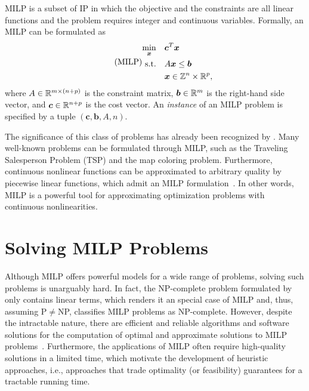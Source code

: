 MILP is a subset of IP in which the objective and the constraints are all linear functions and the problem requires integer and continuous variables.
Formally, an MILP can be formulated as 
\begin{equation}\label{eq:general-milp}\tag{MILP}
\begin{split}
    \min_{\bm{x}} \quad & \bm{c}^{T}\bm{x} \\
    \textrm{s.t.} \quad & A\bm{x} \le \bm{b} \\
	  & \bm{x} \in \mathbb{Z}^{n}\times \mathbb{R}^{p}
,\end{split}
\end{equation}
where $A\in \mathbb{R}^{m\times (n+p)}$ is the constraint matrix, $\bm{b}\in \mathbb{R}^{m}$ is the right-hand side vector, and $\bm{c}\in \mathbb{R}^{n+p}$ is the cost vector.
An \emph{instance} of an MILP problem is specified by a tuple  $\left( \bm{c},\bm{b},A,n \right)$.

The significance of this class of problems has already been recognized by .
Many well-known problems can be formulated through MILP, such as the Traveling Salesperson Problem (TSP) and the map coloring problem.
Furthermore, continuous nonlinear functions can be approximated to arbitrary quality by piecewise linear functions, which admit an MILP formulation~\cite{camponogaraModelsAlgorithmsOptimal2015}.
In other words, MILP is a powerful tool for approximating optimization problems with continuous nonlinearities.

\section{Solving MILP Problems}

Although MILP offers powerful models for a wide range of problems, solving such problems is unarguably hard.
In fact, the NP-complete problem formulated by  only contains linear terms, which renders it an special case of MILP and, thus, assuming P$\neq$NP, classifies MILP problems as NP-complete.
However, despite the intractable nature, there are efficient and reliable algorithms and software solutions for the computation of optimal and approximate solutions to MILP problems~\cite{bengioMachineLearningCombinatorial2021}.
Furthermore, the applications of MILP often require high-quality solutions in a limited time, which motivate the development of heuristic approaches, i.e., approaches that trade optimality (or feasibility) guarantees for a tractable running time.

